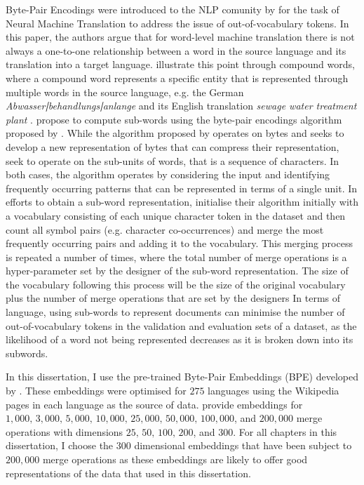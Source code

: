 Byte-Pair Encodings were introduced to the NLP comunity by \cite{Sennrich:2016} for the task of Neural Machine Translation to address the issue of out-of-vocabulary tokens. In this paper, the authors argue that for word-level machine translation there is not always a one-to-one relationship between a word in the source language and its translation into a target language. \citet{Sennrich:2016} illustrate this point through compound words, where a compound word represents a specific entity that is represented through multiple words in the source language, e.g. the German \textit{Abwasser\textbf{|}behandlungs\textbf{|}anlange} and its English translation \textit{sewage water treatment plant} \citep{Sennrich:2016}.
\citet{Sennrich:2016} propose to compute sub-words using the byte-pair encodings algorithm proposed by \citet{Gage:1994}. While the algorithm proposed by \citet{Gage:1994} operates on bytes and seeks to develop a new representation of bytes that can compress their representation, \citet{Sennrich:2016} seek to operate on the sub-units of words, that is a sequence of characters. In both cases, the algorithm operates by considering the input and identifying frequently occurring patterns that can be represented in terms of a single unit.
In efforts to obtain a sub-word representation, \citet{Sennrich:2016} initialise their algorithm initially with a vocabulary consisting of each unique character token in the dataset and then count all symbol pairs (e.g. character co-occurrences) and merge the most frequently occurring pairs and adding it to the vocabulary. This merging process is repeated a number of times, where the total number of merge operations is a hyper-parameter set by the designer of the sub-word representation. The size of the vocabulary following this process will be the size of the original vocabulary plus the number of merge operations that are set by the designers \citep{Sennrich:2016}
In terms of language, using sub-words to represent documents can minimise the number of out-of-vocabulary tokens in the validation and evaluation sets of a dataset, as the likelihood of a word not being represented decreases as it is broken down into its subwords.

In this dissertation, I use the pre-trained Byte-Pair Embeddings (BPE) developed by \citet{Heinzerling:2018}. These embeddings were optimised for $275$ languages using the Wikipedia pages in each language as the source of data. \citet{Heinzerling:2018} provide embeddings for $1,000,\, 3,000,\, 5,000,\, 10,000,\, 25,000,\, 50,000,\, 100,000$, and $200,000$ merge operations with dimensions $25,\, 50,\, 100,\, 200$, and $300$. For all chapters in this dissertation, I choose the $300$ dimensional embeddings that have been subject to $200,000$ merge operations as these embeddings are likely to offer good representations of the data that used in this dissertation.

